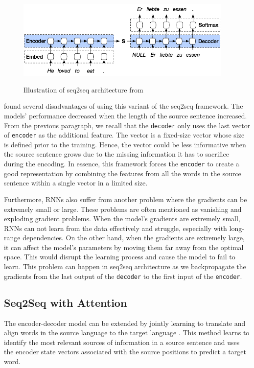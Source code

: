 \begin{figure}[h]
    {\includegraphics[width=0.95\textwidth]{img/rnnseq2seq.png}}
    \centering
    \caption{Illustration of seq2seq architecture from }
    \label{img:rnnseq2seq}
\end{figure}

 found several disadvantages of using this variant of the seq2seq framework. The models' performance decreased when the length of the source sentence increased. From the previous paragraph, we recall that the \texttt{decoder} only uses the last vector of \texttt{encoder} as the additional feature.
The vector is a fixed-size vector whose size is defined prior to the training. Hence, the vector could be less informative when the source sentence grows due to the missing information it has to sacrifice during the encoding. In essence, this framework forces the \texttt{encoder} to create a good representation by combining the features from all the words in the source sentence within a single vector in a limited size.


Furthermore, RNNs also suffer from another problem where the gradients can be extremely small or large. These problems are often mentioned as vanishing and exploding gradient problems. When the model's gradients are extremely small, RNNs can not learn from the data effectively and struggle, especially with long-range dependencies. On the other hand, when the gradients are extremely large, it can affect the model's parameters by moving them far away from the optimal space. This would disrupt the learning process and cause the model to fail to learn. This problem can happen in seq2seq architecture as we backpropagate the gradients from the last output of the \texttt{decoder} to the first input of the \texttt{encoder}.

\subsection{Seq2Seq with Attention}
The encoder-decoder model can be extended by jointly learning to translate and align words in the source language to the target language . This method learns to identify the most relevant sources of information in a source sentence and uses the encoder state vectors associated with the source positions to predict a target word.


